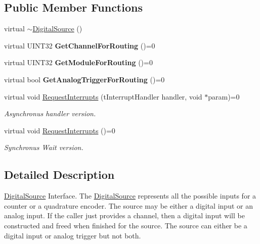 \subsection*{\-Public \-Member \-Functions}
\begin{DoxyCompactItemize}
\item 
virtual \hyperlink{classDigitalSource_a7acf991168815aeed0b8e7514400802b}{$\sim$\-Digital\-Source} ()
\item 
\hypertarget{classDigitalSource_a793640916ab6c7ed63325756033f2752}{virtual \-U\-I\-N\-T32 {\bfseries \-Get\-Channel\-For\-Routing} ()=0}\label{classDigitalSource_a793640916ab6c7ed63325756033f2752}

\item 
\hypertarget{classDigitalSource_a688c770f6ec4bfdfe8ea61a78ca6c31d}{virtual \-U\-I\-N\-T32 {\bfseries \-Get\-Module\-For\-Routing} ()=0}\label{classDigitalSource_a688c770f6ec4bfdfe8ea61a78ca6c31d}

\item 
\hypertarget{classDigitalSource_aa9a9f4c8d6e54b94516b2b015bdb1ee6}{virtual bool {\bfseries \-Get\-Analog\-Trigger\-For\-Routing} ()=0}\label{classDigitalSource_aa9a9f4c8d6e54b94516b2b015bdb1ee6}

\item 
\hypertarget{classDigitalSource_aa34b225d5dc38355ff8bd0a11b6113d3}{virtual void \hyperlink{classDigitalSource_aa34b225d5dc38355ff8bd0a11b6113d3}{\-Request\-Interrupts} (t\-Interrupt\-Handler handler, void $\ast$param)=0}\label{classDigitalSource_aa34b225d5dc38355ff8bd0a11b6113d3}

\begin{DoxyCompactList}\small\item\em \-Asynchronus handler version. \end{DoxyCompactList}\item 
\hypertarget{classDigitalSource_a693e9521e21758c8d5f3d221dc9e9b5b}{virtual void \hyperlink{classDigitalSource_a693e9521e21758c8d5f3d221dc9e9b5b}{\-Request\-Interrupts} ()=0}\label{classDigitalSource_a693e9521e21758c8d5f3d221dc9e9b5b}

\begin{DoxyCompactList}\small\item\em \-Synchronus \-Wait version. \end{DoxyCompactList}\end{DoxyCompactItemize}


\subsection{\-Detailed \-Description}
\hyperlink{classDigitalSource}{\-Digital\-Source} \-Interface. \-The \hyperlink{classDigitalSource}{\-Digital\-Source} represents all the possible inputs for a counter or a quadrature encoder. \-The source may be either a digital input or an analog input. \-If the caller just provides a channel, then a digital input will be constructed and freed when finished for the source. \-The source can either be a digital input or analog trigger but not both. 

